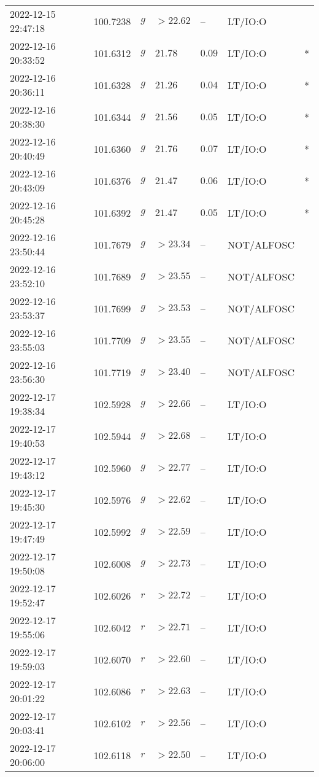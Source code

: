 \documentclass{nature_plusfigure}
\begin{document}
\begin{supplement}
\begin{center}
\begin{longtable}{lllllll}
2022-12-15 22:47:18 & 100.7238 & $g$ & $>22.62$ & -- & LT/IO:O &  \\ 
2022-12-16 20:33:52 & 101.6312 & $g$ & $21.78$ & $0.09$ & LT/IO:O & * \\ 
2022-12-16 20:36:11 & 101.6328 & $g$ & $21.26$ & $0.04$ & LT/IO:O & * \\ 
2022-12-16 20:38:30 & 101.6344 & $g$ & $21.56$ & $0.05$ & LT/IO:O & * \\ 
2022-12-16 20:40:49 & 101.6360 & $g$ & $21.76$ & $0.07$ & LT/IO:O & * \\ 
2022-12-16 20:43:09 & 101.6376 & $g$ & $21.47$ & $0.06$ & LT/IO:O & * \\ 
2022-12-16 20:45:28 & 101.6392 & $g$ & $21.47$ & $0.05$ & LT/IO:O & * \\ 
2022-12-16 23:50:44 & 101.7679 & $g$ & $>23.34$ & -- & NOT/ALFOSC &  \\ 
2022-12-16 23:52:10 & 101.7689 & $g$ & $>23.55$ & -- & NOT/ALFOSC &  \\ 
2022-12-16 23:53:37 & 101.7699 & $g$ & $>23.53$ & -- & NOT/ALFOSC &  \\ 
2022-12-16 23:55:03 & 101.7709 & $g$ & $>23.55$ & -- & NOT/ALFOSC &  \\ 
2022-12-16 23:56:30 & 101.7719 & $g$ & $>23.40$ & -- & NOT/ALFOSC &  \\ 
2022-12-17 19:38:34 & 102.5928 & $g$ & $>22.66$ & -- & LT/IO:O &  \\ 
2022-12-17 19:40:53 & 102.5944 & $g$ & $>22.68$ & -- & LT/IO:O &  \\ 
2022-12-17 19:43:12 & 102.5960 & $g$ & $>22.77$ & -- & LT/IO:O &  \\ 
2022-12-17 19:45:30 & 102.5976 & $g$ & $>22.62$ & -- & LT/IO:O &  \\ 
2022-12-17 19:47:49 & 102.5992 & $g$ & $>22.59$ & -- & LT/IO:O &  \\ 
2022-12-17 19:50:08 & 102.6008 & $g$ & $>22.73$ & -- & LT/IO:O &  \\ 
2022-12-17 19:52:47 & 102.6026 & $r$ & $>22.72$ & -- & LT/IO:O &  \\ 
2022-12-17 19:55:06 & 102.6042 & $r$ & $>22.71$ & -- & LT/IO:O &  \\ 
2022-12-17 19:59:03 & 102.6070 & $r$ & $>22.60$ & -- & LT/IO:O &  \\ 
2022-12-17 20:01:22 & 102.6086 & $r$ & $>22.63$ & -- & LT/IO:O &  \\ 
2022-12-17 20:03:41 & 102.6102 & $r$ & $>22.56$ & -- & LT/IO:O &  \\ 
2022-12-17 20:06:00 & 102.6118 & $r$ & $>22.50$ & -- & LT/IO:O &  \\ 

\end{longtable}
\end{center}
\end{supplement}
\end{document}
